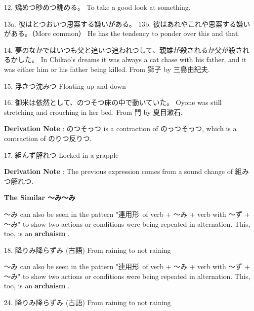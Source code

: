 \par{12. 矯めつ眇めつ眺める。 \hfill\break
To take a good look at something. \hfill\break
}

\par{13a. 彼はとつおいつ思案する嫌いがある。 \hfill\break
13b. 彼はあれやこれや思案する嫌いがある。（More common） \hfill\break
He has the tendency to ponder over this and that. }

\par{14. 夢のなかではいつも父と追いつ追われつして、親雄が殺されるか父が殺されるかした。 \hfill\break
In Chikao's dreams it was always a cat chase with his father, and it was either him or his father being killed. \hfill\break
From 獅子 by 三島由紀夫. }

\par{15. 浮きつ沈みつ \hfill\break
Floating up and down }

\par{16. 御米は依然として、のつそつ床の中で動いていた。 \hfill\break
Oyone was still stretching and crouching in her bed. \hfill\break
From 門 by 夏目漱石. }

\par{\textbf{Derivation Note }: のつそっつ is a contraction of のっつそっつ, which is a contraction of のりつ反りつ. }

\par{17. 組んず解れつ \hfill\break
Locked in a grapple }

\par{\textbf{Derivation Note }: The previous expression comes from a sound change of 組みつ解れつ. }

\begin{center}
\textbf{The Similar ～み～み }
\end{center}

\par{ ～み can also be seen in the pattern "連用形 of verb + ～み + verb with ～ず + ～み" to show two actions or conditions were being repeated in alternation. This, too, is an \textbf{archaism }. }
 
\par{18. 降りみ降らずみ (古語) \hfill\break
From raining to not raining }

\par{ ～み can also be seen in the pattern "連用形 of verb + ～み + verb with ～ず + ～み" to show two actions or conditions were being repeated in alternation. This, too, is an  \textbf{archaism }. }

\par{24. 降りみ降らずみ (古語) \hfill\break
From raining to not raining }
    